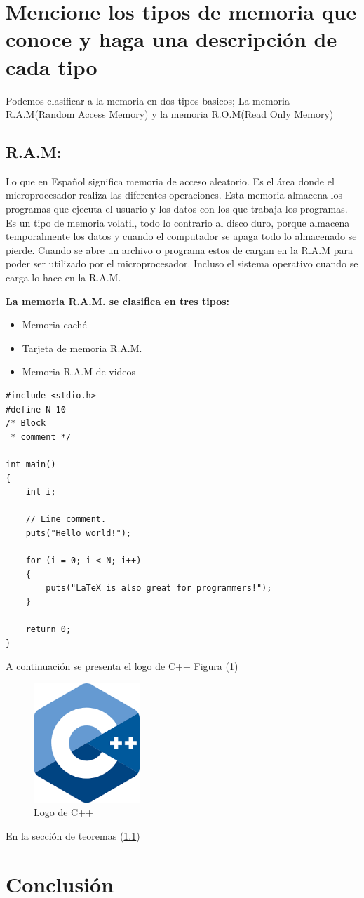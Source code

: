 \documentclass{article}
\begin{document}
\section{Mencione los tipos de memoria que conoce y haga una descripción de cada tipo}

Podemos clasificar a la memoria en dos tipos basicos; La memoria R.A.M(Random Access Memory) y la memoria R.O.M(Read Only Memory)

\subsection{R.A.M:} \label{contenido} Lo que en Español significa memoria de acceso aleatorio. Es el área donde el microprocesador realiza las diferentes operaciones. Esta memoria almacena los programas que ejecuta el usuario y los datos con los que trabaja los programas.
Es un tipo de memoria volatil, todo lo contrario al disco duro, porque almacena temporalmente los datos y cuando el computador se apaga todo lo almacenado se pierde. 
Cuando se abre un archivo o programa estos de cargan en la R.A.M para poder ser utilizado por el microprocesador. Incluso el sistema operativo cuando se carga lo hace en la R.A.M.

\textbf{La memoria R.A.M. se clasifica en tres tipos:}
\begin{itemize}
    \item Memoria caché
    \item Tarjeta de memoria R.A.M.
    \item Memoria R.A.M de videos
\end{itemize}

\begin{lstlisting}
#include <stdio.h>
#define N 10
/* Block
 * comment */

int main()
{
    int i;

    // Line comment.
    puts("Hello world!");
    
    for (i = 0; i < N; i++)
    {
        puts("LaTeX is also great for programmers!");
    }

    return 0;
}
\end{lstlisting}

A continuación se presenta el logo de C++ Figura (\ref{fig:cpplogo})

\begin{figure}[h]
\includegraphics[width=4cm]{cpplogo.png}
\centering
\caption{Logo de C++}
\label{fig:cpplogo}
\end{figure}

En la sección de teoremas (\ref{contenido})

\section{Conclusión} \label{conclulsion}



\end{document}
